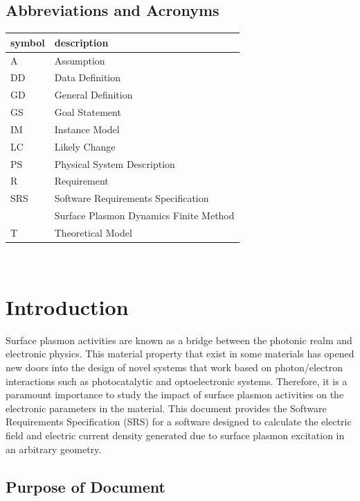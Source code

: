 \documentclass[12pt]{article}
\begin{document}
\subsection{Abbreviations and Acronyms}

\renewcommand{\arraystretch}{1.2}
\begin{tabular}{l l} 
  \toprule		
  \textbf{symbol} & \textbf{description}\\
  \midrule 
  A & Assumption\\
  DD & Data Definition\\
  GD & General Definition\\
  GS & Goal Statement\\
  IM & Instance Model\\
  LC & Likely Change\\
  PS & Physical System Description\\
  R & Requirement\\
  SRS & Software Requirements Specification\\
  \progname{} & Surface Plasmon Dynamics Finite Method\\
  T & Theoretical Model\\
  \bottomrule
\end{tabular}\\


\newpage


\section{Introduction}

Surface plasmon activities are known as a bridge between the photonic realm and electronic physics. This material property that exist in some materials has opened new doors into the design of novel systems that work based on photon/electron interactions such as photocatalytic and optoelectronic systems. Therefore, it is a paramount importance to study the impact of surface plasmon activities on the electronic parameters in the material. This document provides the Software Requirements Specification (SRS) for a software designed to calculate the electric field and electric current density generated due to surface plasmon excitation in an arbitrary geometry. 


\subsection{Purpose of Document}
\end{document}
